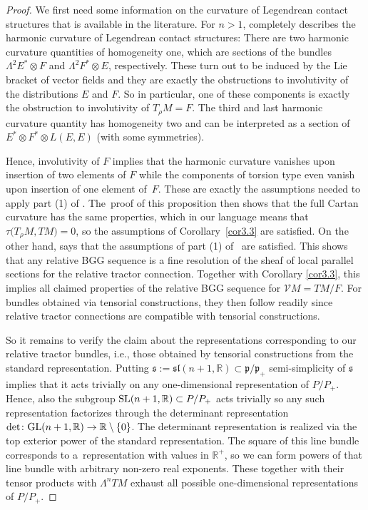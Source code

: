 \documentclass[10pt,a4paper]{amsart}
\numberwithin{equation}{section}
\def\frak{\mathfrak}
\def\Bbb{\mathbb}
\def\Cal{\mathcal}
\newcommand{\La}{\Lambda}
\begin{document}
\begin{proof}
 We first need some information on the curvature of Legendrean contact structures
 that is available in the literature. For $n>1$, \cite[Proposition 4.3.2]{book}
 completely describes the harmonic curvature of Legendrean contact structures: There
 are two harmonic curvature quantities of homogeneity one, which are sections of the
 bundles $\La^2E^*\otimes F$ and $\La^2F^*\otimes E$, respectively. These turn out
 to be induced by the Lie bracket of vector fields and they are exactly the
 obstructions to involutivity of the distributions $E$ and $F$. So in particular,
 one of these components is exactly the obstruction to involutivity of $T_\rho
 M=F$. The third and last harmonic curvature quantity has homogeneity two and can be
 interpreted as a section of $E^*\otimes F^*\otimes L(E,E)$ (with some symmetries).

Hence, involutivity of $F$ implies that the harmonic curvature vanishes upon insertion
of two elements of $F$ while the components of torsion type even vanish upon
insertion of one element of~$F$. These are exactly the assumptions needed to apply
part (1) of \cite[Proposition~4.18]{Rel-BGG2}. The~proof of this proposition then
shows that the full Cartan curvature has the same properties, which in our language
means that $\tau\bigl(T_\rho M,TM\bigr)=0$, so the assumptions of Corollary~\ref{cor3.3} are
satisfied. On the other hand, \cite[Proposition~4.18]{Rel-BGG2} says that the
assumptions of part (1) of~\mbox{\cite[Theorem 4.11]{Rel-BGG2}} are satisfied. This shows
that any relative BGG sequence is a fine resolution of the sheaf of local parallel
sections for the relative tractor connection. Together with Corollary \ref{cor3.3},
this implies all claimed properties of the relative BGG sequence for $\Cal
VM=TM/F$. For bundles obtained via tensorial constructions, they then follow readily
since relative tractor connections are compatible with tensorial constructions.

So it remains to verify the claim about the representations corresponding to our
relative tractor bundles, i.e., those obtained by tensorial constructions from the
standard representation. Putting
$\frak s:=\frak{sl}(n+1,\Bbb R)\subset\frak p/\frak p_+$ semi-simplicity of $\frak s$
implies that it acts trivially on any one-dimensional representation of
$P/P_+$. Hence, also the subgroup ${\rm SL}(n+1,\Bbb R)\subset P/P_+$ acts trivially so any
such representation factorizes through the determinant representation
$\det\colon {\rm GL}(n+1,\Bbb R)\to\Bbb R\setminus\{0\}$. The determinant representation is
realized via the top exterior power of the standard representation. The square of
this line bundle corresponds to a~representation with values in $\Bbb R^+$, so we
can form powers of that line bundle with arbitrary non-zero real
exponents. These together with their tensor products with $\La^nTM$ exhaust all
possible one-dimensional representations of $P/P_+$.


\end{proof}
\end{document}
